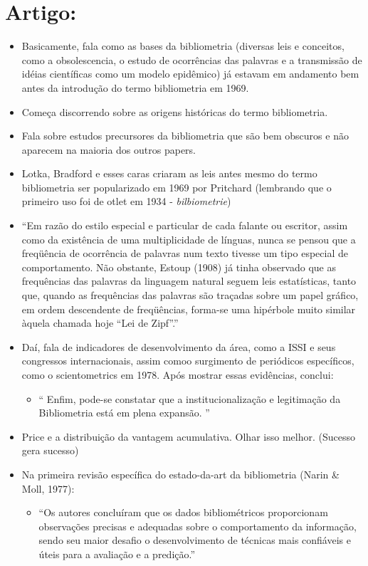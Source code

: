 \documentclass[11pt]{article}
\begin{document}
\section{Artigo: \cite{urbizagastegui}}
\label{sec:orgf571489}
\begin{itemize}
\item Basicamente, fala como as bases da bibliometria (diversas leis e conceitos, como a obsolescencia, o estudo de ocorrências das palavras e a transmissão de idéias científicas como um modelo epidêmico) já estavam em andamento bem antes da introdução do termo bibliometria em 1969.
\item Começa discorrendo sobre as origens históricas do termo bibliometria.
\item Fala sobre estudos precursores da bibliometria que são bem obscuros e não aparecem na maioria dos outros papers.
\item Lotka, Bradford e esses caras criaram as leis antes mesmo do termo bibliometria ser popularizado em 1969 por Pritchard (lembrando que o primeiro uso foi de otlet em 1934 - \emph{bilbiometrie})
\item ``Em razão do estilo especial e particular de cada falante ou escritor, assim como da existência de uma multiplicidade de línguas, nunca se pensou que a freqüência de ocorrência de palavras num texto tivesse um tipo especial de comportamento. Não obstante, Estoup (1908) já tinha observado que as frequências das palavras da linguagem natural seguem leis estatísticas, tanto que, quando as frequências das palavras são traçadas sobre um papel gráfico, em ordem descendente de freqüências, forma-se uma hipérbole muito similar àquela chamada hoje “Lei de Zipf”.''
\item Daí, fala de indicadores de desenvolvimento da área, como a ISSI e seus congressos internacionais, assim comoo surgimento de periódicos específicos, como o scientometrics em 1978. Após mostrar essas evidências, conclui:
\begin{itemize}
\item `` Enfim, pode-se constatar que a institucionalização e legitimação da Bibliometria está em plena expansão. ''
\end{itemize}
\item Price e a distribuição da vantagem acumulativa. Olhar isso melhor. (Sucesso gera sucesso)
\item Na primeira revisão específica do estado-da-art da bibliometria (Narin \& Moll, 1977):
\begin{itemize}
\item ``Os autores concluíram que os dados bibliométricos proporcionam observações precisas e adequadas sobre o comportamento da informação, sendo seu maior desafio o desenvolvimento de técnicas mais confiáveis e úteis para a avaliação e a predição.''

\end{itemize}
\end{itemize}
\end{document}
